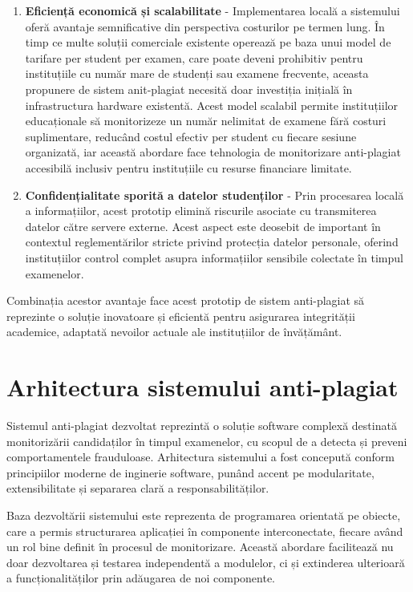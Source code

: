 \documentclass[12pt,a4paper]{article}
\begin{document}
\begin{enumerate}
    \item \textbf{Eficiență economică și scalabilitate} - Implementarea locală a sistemului oferă avantaje semnificative din perspectiva costurilor pe termen lung. În timp ce multe soluții comerciale existente operează pe baza unui model de tarifare per student per examen, care poate deveni prohibitiv pentru instituțiile cu număr mare de studenți sau examene frecvente, aceasta propunere de sistem anit-plagiat necesită doar investiția inițială în infrastructura hardware existentă. Acest model scalabil permite instituțiilor educaționale să monitorizeze un număr nelimitat de examene fără costuri suplimentare, reducând costul efectiv per student cu fiecare sesiune organizată, iar această abordare face tehnologia de monitorizare anti-plagiat accesibilă inclusiv pentru instituțiile cu resurse financiare limitate.
    
    \item \textbf{Confidențialitate sporită a datelor studenților} - Prin procesarea locală a informațiilor, acest prototip elimină riscurile asociate cu transmiterea datelor către servere externe. Acest aspect este deosebit de important în contextul reglementărilor stricte privind protecția datelor personale, oferind instituțiilor control complet asupra informațiilor sensibile colectate în timpul examenelor.
\end{enumerate}

Combinația acestor avantaje face acest prototip de sistem anti-plagiat să reprezinte o soluție inovatoare și eficientă pentru asigurarea integrității academice, adaptată nevoilor actuale ale instituțiilor de învățământ.

\section{Arhitectura sistemului anti-plagiat}

Sistemul anti-plagiat dezvoltat reprezintă o soluție software complexă destinată monitorizării candidaților în timpul examenelor, cu scopul de a detecta și preveni comportamentele frauduloase. Arhitectura sistemului a fost concepută conform principiilor moderne de inginerie software, punând accent pe modularitate, extensibilitate și separarea clară a responsabilităților.

Baza dezvoltării sistemului este reprezenta de programarea orientată pe obiecte, care a permis structurarea aplicației în componente interconectate, fiecare având un rol bine definit în procesul de monitorizare. Această abordare facilitează nu doar dezvoltarea și testarea independentă a modulelor, ci și extinderea ulterioară a funcționalităților prin adăugarea de noi componente.
\end{document}
